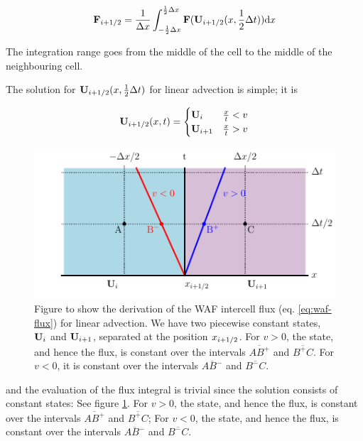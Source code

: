 \begin{equation}
	\mathbf{F}_{i + 1/2} = \frac{1}{\Delta x} \int_{-\frac{1}{2} \Delta x} ^{\frac{1}{2} \Delta x} \mathbf{F} (\mathbf{U}_{i+1/2} ( x, \frac{1}{2}\Delta t)) \mathrm{d} x \label{eq:waf-flux}
\end{equation}

The integration range goes from the middle of the cell to the middle of the neighbouring cell.

The solution for $\mathbf{U}_{i+1/2} ( x, \frac{1}{2}\Delta t)$ for linear advection is simple; it is

\begin{align}
	\mathbf{U}_{i+1/2} ( x, t) = 
		\begin{cases}
			\mathbf{U}_i 		& \frac{x}{t} < v \\
			\mathbf{U}_{i+1} 	& \frac{x}{t} > v \\
		\end{cases}
\end{align}



\begin{figure}[htbp]
	\includegraphics[width=\textwidth]{./figures/WAF.pdf}%
	\caption{Figure to show the derivation of the WAF intercell flux (eq. \ref{eq:waf-flux}) for linear advection.
		We have two piecewise constant states, $\mathbf{U}_i$ and $\mathbf{U}_{i+1}$, separated at the position $x_{i+1/2}$.
		For $v > 0$, the state, and hence the flux, is constant over the intervals $\overline{AB^+}$ and $\overline{B^+C}$.
		For $v < 0$, it is constant over the intervals $\overline{AB^-}$ and $\overline{B^-C}$.
		\label{fig:waf}
	}
\end{figure}



and the evaluation of the flux integral is trivial since the solution consists of constant states:
See figure \ref{fig:waf}.
For $v > 0$, the state, and hence the flux, is constant over the intervals $\overline{AB^+}$ and $\overline{B^+C}$;
For $v < 0$, the state, and hence the flux, is constant over the intervals $\overline{AB^-}$ and $\overline{B^-C}$.

